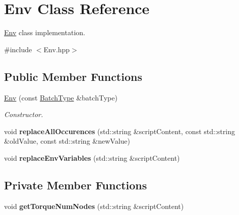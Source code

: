 \hypertarget{classEnv}{
\section{Env Class Reference}
\label{classEnv}
}


\hyperlink{classEnv}{Env} class implementation.  




{\ttfamily \#include $<$Env.hpp$>$}

\subsection*{Public Member Functions}
\begin{DoxyCompactItemize}
\item 
\hyperlink{classEnv_af79a38d660d0c8854858075a529fa8c8}{Env} (const \hyperlink{utilVishnu_8hpp_a864d748e7097d176552dd4c7635016ea}{BatchType} \&batchType)
\begin{DoxyCompactList}\small\item\em Constructor. \item\end{DoxyCompactList}\item 
\hypertarget{classEnv_ae392272deae068e7f74d0ae26231acb2}{
void {\bfseries replaceAllOccurences} (std::string \&scriptContent, const std::string \&oldValue, const std::string \&newValue)}
\label{classEnv_ae392272deae068e7f74d0ae26231acb2}

\item 
\hypertarget{classEnv_abe12e01f5012827ca1a6fb635a613367}{
void {\bfseries replaceEnvVariables} (std::string \&scriptContent)}
\label{classEnv_abe12e01f5012827ca1a6fb635a613367}

\end{DoxyCompactItemize}
\subsection*{Private Member Functions}
\begin{DoxyCompactItemize}
\item 
\hypertarget{classEnv_ac6516808e45dbea3e40383ba8a1525ed}{
void {\bfseries getTorqueNumNodes} (std::string \&scriptContent)}
\label{classEnv_ac6516808e45dbea3e40383ba8a1525ed}

\end{DoxyCompactItemize}

